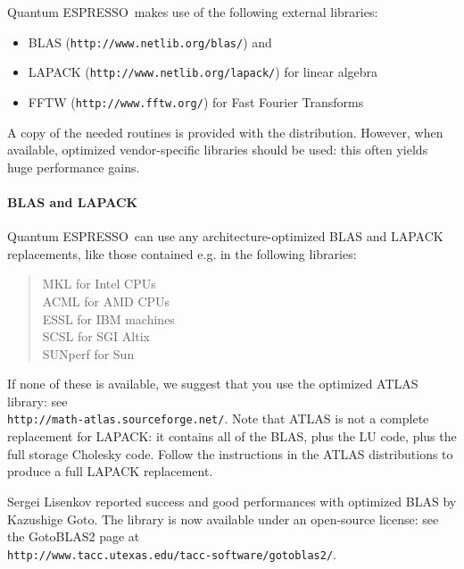 \documentclass[12pt,a4paper]{article}
\def\qe{{\sc Quantum ESPRESSO}}
\begin{document}
\qe\ makes use of the following external libraries:
\begin{itemize}
\item BLAS (\texttt{http://www.netlib.org/blas/}) and
\item LAPACK (\texttt{http://www.netlib.org/lapack/}) for linear algebra
\item FFTW (\texttt{http://www.fftw.org/}) for Fast Fourier Transforms
\end{itemize}
A copy of the needed routines is provided with the distribution. However,
when available, optimized vendor-specific libraries should be used: this
often yields huge performance gains.

\paragraph{BLAS and LAPACK}
\qe\ can use any architecture-optimized BLAS and LAPACK replacements,
like those contained e.g. in the following libraries:
\begin{quote}
MKL for Intel CPUs\\
ACML for AMD CPUs\\
ESSL for IBM machines\\
SCSL for SGI Altix\\
SUNperf for Sun
\end{quote}

If none of these is available, we suggest that you use the optimized ATLAS
library: see \\
\texttt{http://math-atlas.sourceforge.net/}. Note that ATLAS is not
a complete replacement for LAPACK: it contains all of the BLAS, plus the
LU code, plus the full storage Cholesky code. Follow the instructions in the
ATLAS distributions to produce a full LAPACK replacement.

Sergei Lisenkov reported success and good performances with optimized
BLAS by Kazushige Goto. The library is now available under an
open-source license: see the GotoBLAS2 page at \\
\texttt{http://www.tacc.utexas.edu/tacc-software/gotoblas2/}.
\end{document}
